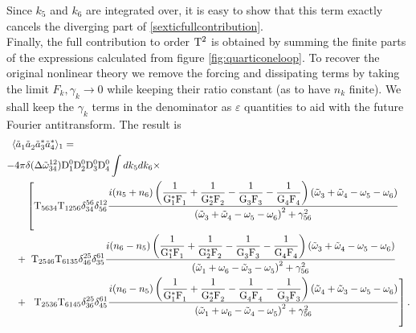 Since $k_5$ and $k_6$ are integrated over, it is easy to show that this term exactly cancels the diverging part of \eqref{sexticfullcontribution}.\\
Finally, the full contribution to order $\mathrm{T}^2$ is obtained by summing the finite parts of the expressions calculated from figure \ref{fig:quarticoneloop}.
To recover the original nonlinear theory we remove the forcing and dissipating terms by taking the limit $F_k, \gamma_k \rightarrow 0$ while keeping their ratio constant
(as to have $n_k$ finite). We shall keep the $\gamma_k$ terms in the denominator as $\varepsilon$ quantities to aid with the future Fourier antitransform. The result is
\begin{equation}
    \begin{aligned}
    \langle\tilde{a}_1^{} &\tilde{a}_2^{}\tilde{a}_3^{*}\tilde{a}_4^{*} \rangle_1 = 
    \\
    -4\pi &\delta(\Delta{\tilde{\omega}}^{12}_{34})\mathrm{D}^0_1\mathrm{D}^0_2\mathrm{D}^0_3\mathrm{D}^0_4 \int dk_5 dk_6 \times
    \\
      &\left[\mathrm{T}_{5634}\mathrm{T}_{1256}\delta^{56}_{34}\delta^{12}_{56}
    \frac{i(n_5 + n_6)\left(\dfrac{1}{\mathrm{G}_1^*\mathrm{F}_1^{}}+\dfrac{1}{\mathrm{G}_2^*\mathrm{F}_2^{}}-\dfrac{1}{\mathrm{G}_3^{}\mathrm{F}_3^{}}
    -\dfrac{1}{\mathrm{G}_4^{}\mathrm{F}_4^{}}\right)\left( \tilde{\omega}^{}_3 + \tilde{\omega}^{}_4 - \omega^{}_5 - \omega^{}_6\right)}{\left( \tilde{\omega}^{}_3 + \tilde{\omega}^{}_4 - \omega^{}_5 - \omega^{}_6\right)^2 + \gamma^2_{56}}
      \right.
    \\
    +&\hspace{2mm}\mathrm{T}_{2546}\mathrm{T}_{6135}\delta^{25}_{46}\delta^{61}_{35}
    \frac{i(n_6 - n_5)\left(\dfrac{1}{\mathrm{G}_1^*\mathrm{F}_1^{}}+\dfrac{1}{\mathrm{G}_2^*\mathrm{F}_2^{}}-\dfrac{1}{\mathrm{G}_3^{}\mathrm{F}_3^{}}
    -\dfrac{1}{\mathrm{G}_4^{}\mathrm{F}_4^{}}\right)\left( \tilde{\omega}^{}_3 + \tilde{\omega}^{}_4 - \omega^{}_5 - \omega^{}_6\right)}{\left( \tilde{\omega}^{}_1 + \omega^{}_6 - \tilde{\omega}^{}_3 - \omega^{}_5\right)^2 + \gamma^2_{56}}\\
    +&\hspace{2mm}\left. \mathrm{T}_{2536}\mathrm{T}_{6145}\delta^{25}_{36}\delta^{61}_{45}
    \frac{i(n_6 - n_5)\left(\dfrac{1}{\mathrm{G}_1^*\mathrm{F}_1^{}}+\dfrac{1}{\mathrm{G}_2^*\mathrm{F}_2^{}}-\dfrac{1}{\mathrm{G}_4^{}\mathrm{F}_4^{}}
    -\dfrac{1}{\mathrm{G}_3^{}\mathrm{F}_3^{}}\right)\left( \tilde{\omega}^{}_4 + \tilde{\omega}^{}_3 - \omega^{}_5 - \omega^{}_6\right)}{\left( \tilde{\omega}^{}_1 + \omega^{}_6 - \tilde{\omega}^{}_4 - \omega^{}_5\right)^2 + \gamma^2_{56}} \right].
    \end{aligned}
    \label{transformedfourpoint}
\end{equation}
